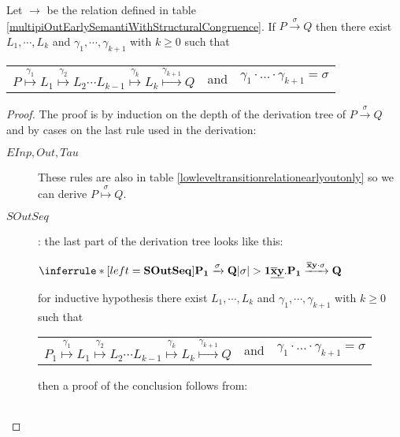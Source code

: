 \begin{proposition}\label{equivalencehightolow}
  Let $\rightarrow$ be the relation defined in table \ref{multipiOutEarlySemantiWithStructuralCongruence}. If $P\xrightarrow{\sigma} Q$ then there exist $L_{1}, \cdots, L_{k}$ and $\gamma_{1}, \cdots, \gamma_{k+1}$ with $k\geq 0$ such that 
  \begin{center}
    \begin{tabular}{lll}
      $P \stackrel{\gamma_{1}}{\longmapsto} L_{1} \stackrel{\gamma_{2}}{\longmapsto} L_{2} \cdots L_{k-1} \stackrel{\gamma_{k}}{\longmapsto} L_{k} \stackrel{\gamma_{k+1}}{\longmapsto} Q$ 
    &
      and
    &
      $\gamma_{1} \cdot \ldots \cdot \gamma_{k+1} = \sigma$  
    \end{tabular}
  \end{center}
  \begin{proof}
    The proof is by induction on the depth of the derivation tree of $P\xrightarrow{\sigma} Q$ and by cases on the last rule used in the derivation:
    \begin{description}
      \item[$EInp, Out, Tau$]
      These rules are also in table \ref{lowleveltransitionrelationearlyoutonly} so we can derive $P \stackrel{\sigma}{\longmapsto}Q$.
      \item[$SOutSeq$]: 
	    the last part of the derivation tree looks like this:
	    \begin{center}
	      $\inferrule* [left=\bf{SOutSeq}]{
		  P_{1} \xrightarrow{\sigma} Q
		\\
		  |\sigma|>1
	      }{
		\underline{\overline{x}y}.P_{1} \xrightarrow{\overline{x}y \cdot \sigma} Q
	      }$	      
	    \end{center}
	    for inductive hypothesis there exist $L_{1}, \cdots, L_{k}$ and $\gamma_{1}, \cdots, \gamma_{k+1}$ with $k\geq 0$ such that 
	    \begin{center}
	      \begin{tabular}{lll}
		$P_{1} \stackrel{\gamma_{1}}{\longmapsto} L_{1} \stackrel{\gamma_{2}}{\longmapsto} L_{2} \cdots L_{k-1} \stackrel{\gamma_{k}}{\longmapsto} L_{k} \stackrel{\gamma_{k+1}}{\longmapsto} Q$ 
	      &
		and
	      &
		$\gamma_{1} \cdot \ldots \cdot \gamma_{k+1} =  \sigma$
	      \end{tabular}
	    \end{center}
	    then a proof of the conclusion follows from:
	    \begin{center}
	      \begin{tabular}{ll}

\end{tabular}
\end{center}
\end{description}
\end{proof}
\end{proposition}
